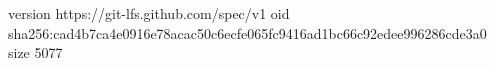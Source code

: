 version https://git-lfs.github.com/spec/v1
oid sha256:cad4b7ca4e0916e78acac50c6ecfe065fc9416ad1bc66c92edee996286cde3a0
size 5077
